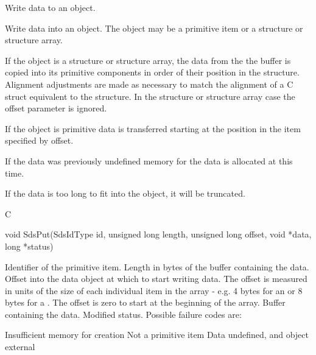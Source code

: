 \begin{manroutinedescription}
      Write data to an object.

      Write data into an object. The object may be a primitive item or a
      structure or structure array.

      If the object is a structure or structure array, the data from the
      the buffer is copied into its primitive components in order of their
      position in the structure. Alignment adjustments are made as necessary
      to match the alignment of a C struct equivalent to the {} %
structure.
      In the structure or structure array case the offset parameter is
      ignored.

      If the object is primitive data is transferred starting
      at the position in the item specified by offset.

      If the data was previously undefined memory for the data is allocated at
      this time.

      If the data is too long to fit into the object, it will be truncated.
 
      C

      void SdsPut(SdsIdType id, unsigned long length, unsigned long offset,
             void *data, long *status)
 
\begin{manparametertable}
 Identifier of the primitive item.
  Length in bytes of the %
buffer containing
                            the data.
  Offset into the data %
object at which to start
                            writing data. The offset is measured in units of
                            the size of each individual item in the array -
                            e.g. 4 bytes for an {} or 8 bytes for a %
{}.
                            The offset is zero to start at the beginning of the
                            array.
 Buffer containing the data.
 Modified status. Possible %
failure codes are:
\end{manparametertable}
\begin{mantwocolumntable}
Insufficient memory for creation
Not a primitive item
Data undefined, and object %
external
\end{mantwocolumntable}
\end{manroutinedescription}

